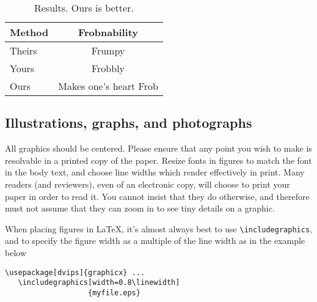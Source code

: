 \documentclass[10pt,twocolumn,letterpaper]{article}
\begin{document}
\begin{table}
\begin{center}
\begin{tabular}{|l|c|}
\hline
Method & Frobnability \\
\hline\hline
Theirs & Frumpy \\
Yours & Frobbly \\
Ours & Makes one's heart Frob\\
\hline
\end{tabular}
\end{center}
\caption{Results.   Ours is better.}
\end{table}

\subsection{Illustrations, graphs, and photographs}

All graphics should be centered.  Please ensure that any point you wish to make
is resolvable in a printed copy of the paper.  Resize fonts in figures to match
the font in the body text, and choose line widths which render effectively in
print.  Many readers (and reviewers), even of an electronic copy, will choose to
print your paper in order to read it.  You cannot insist that they do otherwise,
and therefore must not assume that they can zoom in to see tiny details on a
graphic.

When placing figures in \LaTeX, it's almost always best to use
\verb+\includegraphics+, and to specify the  figure width as a multiple of the
line width as in the example below {\small\begin{verbatim}
\usepackage[dvips]{graphicx} ...
   \includegraphics[width=0.8\linewidth]
                   {myfile.eps}
\end{verbatim}
}


{\small


}
\end{document}
